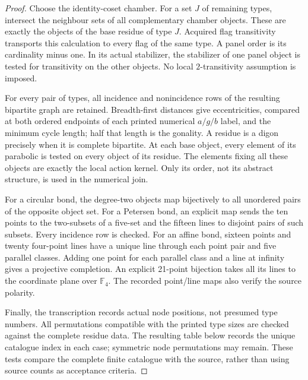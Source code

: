 \documentclass[10pt]{article}
\begin{document}
\begin{proof}
Choose the identity-coset chamber.  For a set $J$ of remaining types, intersect
the neighbour sets of all complementary chamber objects.  These are exactly
the objects of the base residue of type $J$.  Acquired flag transitivity
transports this calculation to every flag of the same type.  A panel order is
its cardinality minus one.  In its actual stabilizer, the stabilizer of one
panel object is tested for transitivity on the other objects.  No local
$2$-transitivity assumption is imposed.

For every pair of types, all incidence and nonincidence rows of the resulting
bipartite graph are retained.  Breadth-first distances give eccentricities, compared at both ordered
endpoints of each printed numerical $a/g/b$ label, and the minimum cycle length; half that length is the gonality.  A residue is a
digon precisely when it is complete bipartite.  At each base object, every
element of its parabolic is tested on every object of its residue.  The
elements fixing all these objects are exactly the local action kernel.
Only its order, not its abstract structure, is used in the numerical join.

For a circular bond, the degree-two objects map bijectively to all unordered
pairs of the opposite object set.  For a Petersen bond, an explicit map sends
the ten points to the two-subsets of a five-set and the fifteen lines to
disjoint pairs of such subsets.  Every incidence row is checked.  For an
affine bond, sixteen points and twenty four-point lines have a unique line
through each point pair and five parallel classes.  Adding one point for each
parallel class and a line at infinity gives a projective completion.  An
explicit 21-point bijection takes all its lines to the coordinate plane over
$\mathbb F_4$.  The recorded point/line maps also verify the source polarity.

Finally, the transcription records actual node positions, not presumed type
numbers.  All permutations compatible with the printed type sizes are checked
against the complete residue data.  The resulting table below records the
unique catalogue index in each case; symmetric node permutations may remain.
These tests compare the complete finite catalogue with the source, rather
than using source counts as acceptance criteria.
\end{proof}
\end{document}
